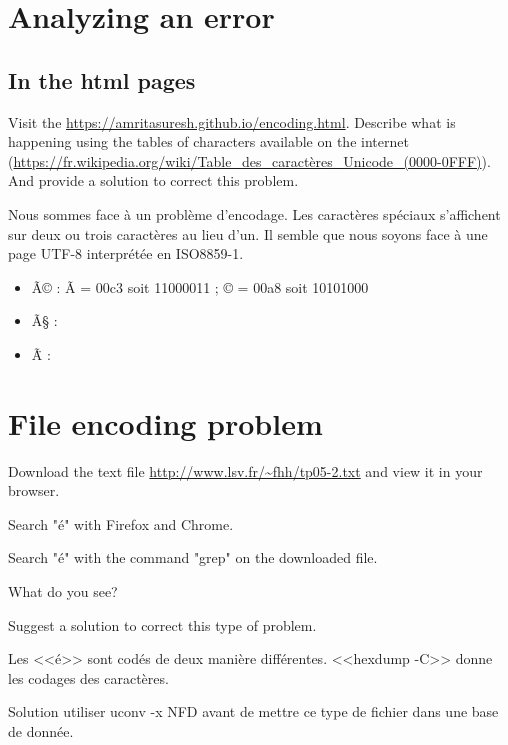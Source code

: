 \documentclass[11pt]{article}
\begin{document}
\section{Analyzing an error}


\subsection{In the html pages}
Visit the \url{https://amritasuresh.github.io/encoding.html}\bigskip. Describe what is happening using the tables of characters available on the internet (\url{https://fr.wikipedia.org/wiki/Table_des_caractères_Unicode_(0000-0FFF)}). 
And provide a solution to correct this problem.


\begin{solution}

Nous sommes face à un problème d'encodage. Les caractères spéciaux s'affichent
sur deux ou trois caractères au lieu d'un. Il semble que nous soyons face à une
page UTF-8 interprétée en ISO8859-1.

\begin{itemize}
\item Ã© : Ã = 00c3 soit 11000011 ; © = 00a8 soit 10101000
\item Ã§ :
\item Ã\"{ } : 
\end{itemize}

\end{solution}



\section{File encoding problem}
Download the text file \url{http://www.lsv.fr/~fhh/tp05-2.txt} and view it in your browser.

Search "é" with Firefox and Chrome.

Search "é" with the command "grep" on the downloaded file. 

What do you see? 

Suggest a solution to correct this type of problem.


\begin{solution}
Les <<é>> sont codés de deux manière différentes. <<hexdump -C>> donne les codages des caractères.

Solution utiliser uconv -x NFD avant de mettre ce type de fichier dans une base de donnée.
\end{solution}
\end{document}
